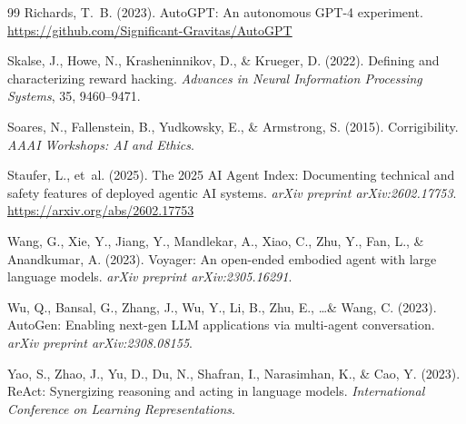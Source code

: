 \documentclass[12pt,a4paper]{article}
\begin{document}
\begin{thebibliography}{99}
Richards, T.~B. (2023). AutoGPT: An autonomous GPT-4 experiment. \url{https://github.com/Significant-Gravitas/AutoGPT}

Skalse, J., Howe, N., Krasheninnikov, D., \& Krueger, D. (2022). Defining and characterizing reward hacking. \emph{Advances in Neural Information Processing Systems}, 35, 9460--9471.

Soares, N., Fallenstein, B., Yudkowsky, E., \& Armstrong, S. (2015). Corrigibility. \emph{AAAI Workshops: AI and Ethics}.

Staufer, L., et~al. (2025). The 2025 AI Agent Index: Documenting technical and safety features of deployed agentic AI systems. \emph{arXiv preprint arXiv:2602.17753}. \url{https://arxiv.org/abs/2602.17753}

Wang, G., Xie, Y., Jiang, Y., Mandlekar, A., Xiao, C., Zhu, Y., Fan, L., \& Anandkumar, A. (2023). Voyager: An open-ended embodied agent with large language models. \emph{arXiv preprint arXiv:2305.16291}.

Wu, Q., Bansal, G., Zhang, J., Wu, Y., Li, B., Zhu, E., \ldots \& Wang, C. (2023). AutoGen: Enabling next-gen LLM applications via multi-agent conversation. \emph{arXiv preprint arXiv:2308.08155}.

Yao, S., Zhao, J., Yu, D., Du, N., Shafran, I., Narasimhan, K., \& Cao, Y. (2023). ReAct: Synergizing reasoning and acting in language models. \emph{International Conference on Learning Representations}.

\end{thebibliography}
\end{document}
